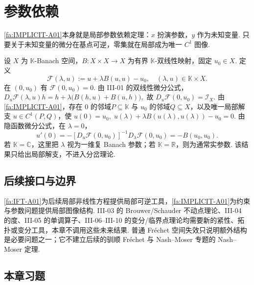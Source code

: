 \section{参数依赖}\label{sec:iii02-parameter}

\autoref{fa:IMPLICIT-A01}本身就是局部参数依赖定理：\(\displaystyle x\) 扮演参数，\(\displaystyle y\) 作为未知变量. 只要关于未知变量的微分在基点可逆，零集就在局部成为唯一 \(\displaystyle C^1\) 图像.

\begin{FAApplication}[二次型局部解支]
设 \(\displaystyle X\) 为 \(\displaystyle\mathbb K\)-Banach 空间，\(\displaystyle B:X\times X\to X\) 为有界 \(\displaystyle\mathbb K\)-双线性映射，固定 \(\displaystyle u_0\in X\). 定义
\[
\mathcal F(\lambda,u)
:=
u+\lambda B(u,u)-u_0,
\quad
(\lambda,u)\in\mathbb K\times X.
\]
在 \(\displaystyle(0,u_0)\) 有 \(\displaystyle\mathcal F(0,u_0)=0\). 由 III-01 的双线性微分公式，
\(\displaystyle D_u\mathcal F(\lambda,u)h = h+\lambda\bigl(B(h,u)+B(u,h)\bigr),\)
故
\(\displaystyle D_u\mathcal F(0,u_0) = \mathcal I_X.\)
由\autoref{fa:IMPLICIT-A01}，存在 \(\displaystyle0\) 的邻域\(\displaystyle P\subseteq\mathbb K\) 与 \(\displaystyle u_0\) 的邻域\(\displaystyle Q\subseteq X\)，以及唯一局部解支 \(\displaystyle u\in C^1(P,Q)\)，使
\(\displaystyle u(0)=u_0, \; u(\lambda)+\lambda B(u(\lambda),u(\lambda))-u_0=0.\)
由隐函数微分公式，在 \(\displaystyle\lambda=0\)，
\[
u'(0)
=
-[D_u\mathcal F(0,u_0)]^{-1}D_\lambda\mathcal F(0,u_0)
=
-B(u_0,u_0).
\]
若 \(\displaystyle\mathbb K=\mathbb C\)，这里把 \(\displaystyle\lambda\) 视为一维复 Banach 参数；若 \(\displaystyle\mathbb K=\mathbb R\)，则为通常实参数. 该结果只给出局部解支，不进入分岔理论.
\end{FAApplication}

\subsection{后续接口与边界}

\autoref{fa:IFT-A01}为后续局部非线性方程提供局部可逆工具，\autoref{fa:IMPLICIT-A01}为约束与参数问题提供局部图像结构. III-03 的 Brouwer/Schauder 不动点理论、III-04 的度、III-05 的单调算子、III-06--III-10 的变分/临界点理论均需要新的紧性、拓扑或变分工具，本章不调用这些未来结果. 普通 Fréchet 空间失效只说明额外结构是必要问题之一；它不建立后续的驯顺 Fréchet 与 Nash--Moser 专题的 Nash--Moser 定理.

\subsection*{本章习题}\label{sec:iii02-exercises}

